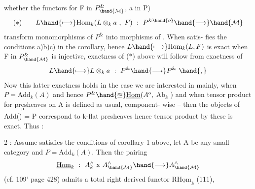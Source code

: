 whether the functors \hand{(}for F in $P^{\&}_{\hand{\mathcal{M}}}$, a in P)
\[ (\ast) \qquad L \hand{\longmapsto} \mathrm{Hom}_k(L\otimes_k a \ , \ F) \ : \ P^{\&\hand{o}} \hand{\longrightarrow} \hand{\mathcal{M}} \]
transform monomorphisms of $P^{\&}$ into morphisms of . When  satis-%
 fies the conditions  a)b)c) in the corollary, hence 
$L \hand{\longmapsto} \mathrm{Hom}_k(L,F)$ is exact when F in $P^{\&}_{\hand{\mathcal{M}}}$ is injective, exactness of ($\ast$)
above will follow from exactness of
\[ L \hand{\longmapsto} L\otimes_k a \ : \ P^{\&} \hand{\longrightarrow} P^{\&} \ \hand{,} \]
Now this latter exactness holds in  the case we are interested in
mainly, when $P = \mathrm{Add}_k(A)$ and hence  $P^{\&} \hand{\approxeq} \underline{\mathrm{Hom}}(A^{\mathrm{o}},$ \deleted{(}$\mathrm{Ab}_k$ ) and when
tensor product  for pr\(\underset{\text{p}}{\text{e}}\)sheaves on A is defined as usual, component-%
wise -- then the objects of Add() = P correspond to k-flat presheaves\hand{,}
hence tensor product by these is exact. Thus :

\hand{\uline{\textcolor{black}{Corollary}}} 2 : Assume  satisfies the conditions of corollary 1 above,
let A be any small category and $P = \mathrm{Add}_k(A)$. Then the pairing 
\[ \underline{\mathrm{Hom}}_k \ : \ A^{\wedge}_k \ \mathrm{x}\ A^{\wedge}_{\hand{\mathcal{M}}} \hand{\longrightarrow} A^{\wedge}_{\hand{\mathcal{M}}} \]
(cf. 109' page 428) admits a total right derived functor R$\underline{\mathrm{Hom}}_k$ (111),


